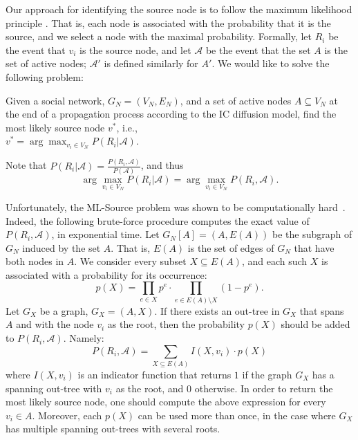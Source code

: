 \documentclass[sigconf,anonymous]{aamas}
\begin{document}
Our approach for identifying the source node is to follow the maximum likelihood principle \cite{myung2003tutorial}. That is, each node is associated with the probability that it is the source, and we select a node with the maximal probability. Formally, let $R_i$ be the event that $v_i$ is the source node, and let $\mathcal{A}$ be the event that the set $A$ is the set of active nodes; $\mathcal{A'}$ is defined similarly for $A'$. We would like to solve the following problem:

\begin{definition}[ML-Source]
Given a social network, $G_N=(V_N,E_N)$, and a set of active nodes $A\subseteq V_N$ at the end of a propagation process according to the IC diffusion model, find the most likely source node $v^*$, i.e.,\\ $
v^* = \arg\max_{v_i \in V_N} P(R_i | \mathcal{A}).
$ 
\end{definition}
\noindent Note that $P(R_i | \mathcal{A}) = \frac{P(R_i,\mathcal{A})}{P(\mathcal{A})}$, and thus 
$$
\arg\max_{v_i \in V_N} P(R_i | \mathcal{A}) = \arg\max_{v_i \in V_N} P(R_i,\mathcal{A}).$$
%

Unfortunately, the ML-Source problem was shown to be computationally hard~\cite{zhai2015cascade}.
Indeed, the following brute-force procedure computes the exact value of $P(R_i,\mathcal{A})$, in exponential time.
Let $G_N[A] = (A, E(A))$ be the subgraph of $G_N$ induced by the set $A$. That is, $E(A)$ is the set of edges of $G_N$ that have both nodes in $A$.
We consider every subset $X\subseteq E(A)$, and each such $X$ is associated with a probability for its occurrence: 
$$
p(X)=\prod_{e\in X}p^e\cdot \prod_{e\in E(A)\setminus X} (1-p^e).
$$
Let $G_X$ be a graph, $G_X =(A,X)$. If there exists an out-tree in $G_X$ that spans $A$ and with the node $v_i$ as the root, then the probability $p(X)$ should be added to $P(R_i,\mathcal{A})$. Namely:
$$
P(R_i,\mathcal{A}) = \sum_{X\subseteq E(A)} I (X,v_i)\cdot p(X)
$$
where $I(X,v_i)$ is an indicator function that returns $1$ if the graph $G_X$ has a spanning out-tree with $v_i$ as the root, and $0$ otherwise.
In order to return the most likely source node, one should compute the above expression for every $v_i\in A$. Moreover, each $p(X)$ can be used more than once, in the case where $G_X$ has multiple spanning out-trees with several roots.
\end{document}
